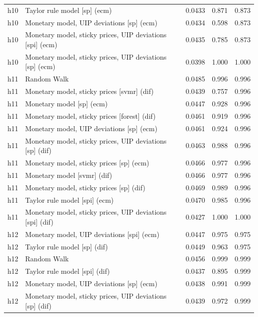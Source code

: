 \begin{ThreePartTable}
\begin{longtable}[t]{cp{5.5cm}ccc}
h10 & \raggedright Taylor rule model [sp] (ecm) & 0.0433 & 0.871 & 0.873\\
h10 & \raggedright Monetary model, UIP deviations [sp] (ecm) & 0.0434 & 0.598 & 0.873\\
h10 & \raggedright Monetary model, sticky prices, UIP deviations [spi] (ecm) & 0.0435 & 0.785 & 0.873\\
h10 & \raggedright Monetary model, sticky prices, UIP deviations [sp] (ecm) & 0.0398 & 1.000 & 1.000\\
\addlinespace
h11 & \raggedright Random Walk & 0.0485 & 0.996 & 0.996\\
h11 & \raggedright Monetary model, sticky prices [svmr] (dif) & 0.0439 & 0.757 & 0.996\\
h11 & \raggedright Monetary model [sp] (ecm) & 0.0447 & 0.928 & 0.996\\
h11 & \raggedright Monetary model, sticky prices [forest] (dif) & 0.0461 & 0.919 & 0.996\\
h11 & \raggedright Monetary model, UIP deviations [sp] (ecm) & 0.0461 & 0.924 & 0.996\\
h11 & \raggedright Monetary model, sticky prices, UIP deviations [sp] (dif) & 0.0463 & 0.988 & 0.996\\
h11 & \raggedright Monetary model, sticky prices [sp] (ecm) & 0.0466 & 0.977 & 0.996\\
h11 & \raggedright Monetary model [svmr] (dif) & 0.0466 & 0.977 & 0.996\\
h11 & \raggedright Monetary model, sticky prices [sp] (dif) & 0.0469 & 0.989 & 0.996\\
h11 & \raggedright Taylor rule model [spi] (ecm) & 0.0470 & 0.985 & 0.996\\
h11 & \raggedright Monetary model, sticky prices, UIP deviations [spi] (dif) & 0.0427 & 1.000 & 1.000\\
\addlinespace
h12 & \raggedright Monetary model, UIP deviations [spi] (ecm) & 0.0447 & 0.975 & 0.975\\
h12 & \raggedright Taylor rule model [sp] (dif) & 0.0449 & 0.963 & 0.975\\
h12 & \raggedright Random Walk & 0.0456 & 0.999 & 0.999\\
h12 & \raggedright Taylor rule model [spi] (dif) & 0.0437 & 0.895 & 0.999\\
h12 & \raggedright Monetary model, UIP deviations [sp] (ecm) & 0.0438 & 0.991 & 0.999\\
h12 & \raggedright Monetary model, sticky prices, UIP deviations [sp] (dif) & 0.0439 & 0.972 & 0.999\\

\end{longtable}
\end{ThreePartTable}
